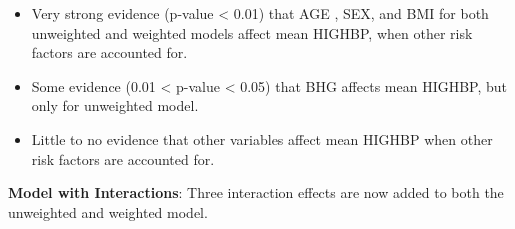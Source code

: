 \documentclass[paperwidth=58in,paperheight=47in,portrait]{baposter}
\begin{document}
\begin{poster}
{\begin{center}
\end{center}

\begin{itemize}
\item Very strong evidence (p-value < 0.01) that AGE , SEX, and BMI for both unweighted and weighted models affect mean HIGHBP, when other risk factors are accounted for.
\item Some evidence (0.01 < p-value < 0.05) that BHG affects mean HIGHBP, but only for unweighted model.
\item Little to no evidence that other variables affect mean HIGHBP when other risk factors are accounted for.
\end{itemize}

\textbf{Model with Interactions}: Three interaction effects are now added to both the unweighted and weighted model.
\begin{center}
\end{center}

}
\end{poster}
\end{document}
